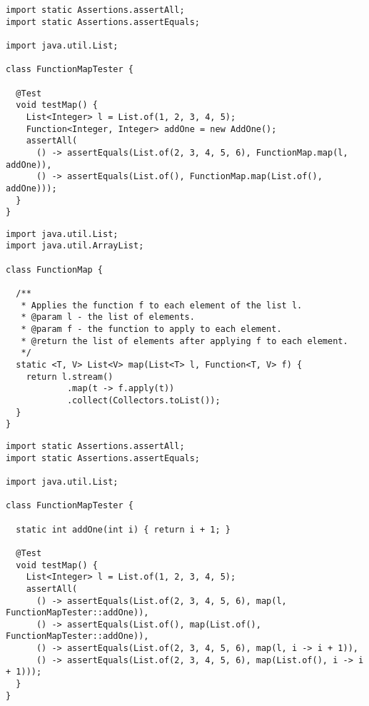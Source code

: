 \begin{lstlisting}[language=MyJava]
import static Assertions.assertAll;
import static Assertions.assertEquals;

import java.util.List;

class FunctionMapTester {

  @Test
  void testMap() {
    List<Integer> l = List.of(1, 2, 3, 4, 5);
    Function<Integer, Integer> addOne = new AddOne();
    assertAll(
      () -> assertEquals(List.of(2, 3, 4, 5, 6), FunctionMap.map(l, addOne)),
      () -> assertEquals(List.of(), FunctionMap.map(List.of(), addOne)));
  }
}
\end{lstlisting}

\begin{lstlisting}[language=MyJava]
import java.util.List;
import java.util.ArrayList;

class FunctionMap {

  /**
   * Applies the function f to each element of the list l.
   * @param l - the list of elements.
   * @param f - the function to apply to each element.
   * @return the list of elements after applying f to each element.
   */
  static <T, V> List<V> map(List<T> l, Function<T, V> f) {
    return l.stream()
            .map(t -> f.apply(t))
            .collect(Collectors.toList());
  }
}
\end{lstlisting}


\begin{lstlisting}[language=MyJava]
import static Assertions.assertAll;
import static Assertions.assertEquals;

import java.util.List;

class FunctionMapTester {

  static int addOne(int i) { return i + 1; }

  @Test
  void testMap() {
    List<Integer> l = List.of(1, 2, 3, 4, 5);
    assertAll(
      () -> assertEquals(List.of(2, 3, 4, 5, 6), map(l, FunctionMapTester::addOne)),
      () -> assertEquals(List.of(), map(List.of(), FunctionMapTester::addOne)),
      () -> assertEquals(List.of(2, 3, 4, 5, 6), map(l, i -> i + 1)),
      () -> assertEquals(List.of(2, 3, 4, 5, 6), map(List.of(), i -> i + 1)));
  }
}
\end{lstlisting}

